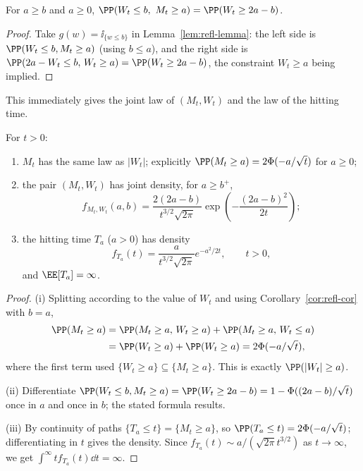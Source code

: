 \begin{corollary}\label{cor:refl-cor}
	For $a\geq b$ and $a\geq0$, $\PP(W_t\leq b,\ M_t\geq a) = \PP(W_t \geq 2a-b)$.
\end{corollary}

\begin{proof}
	Take $g(w) = \ii_{\{w\leq b\}}$ in Lemma~\ref{lem:refl-lemma}: the left side is $\PP(W_t\leq b, M_t\geq a)$ (using $b \leq a$), and the right side is $\PP(2a-W_t \leq b,\, W_t \geq a) = \PP(W_t\geq 2a-b)$, the constraint $W_t\geq a$ being implied.
\end{proof}

This immediately gives the joint law of $(M_t, W_t)$ and the law of the hitting time.

\begin{theorem}\label{thm:max-law}
	For $t>0$:
	\begin{enumerate}[label=(\roman*)]
		\item $M_t$ has the same law as $|W_t|$; explicitly $\PP(M_t\geq a) = 2\Phi(-a/\sqrt t)$ for $a\geq0$;
		\item the pair $(M_t,W_t)$ has joint density, for $a\geq b^+$,
		$$
		f_{M_t,W_t}(a,b) = \frac{2(2a-b)}{t^{3/2}\sqrt{2\pi}}\exp\left(-\frac{(2a-b)^2}{2t}\right);
		$$
		\item the hitting time $T_a$ ($a>0$) has density
		$$
		f_{T_a}(t) = \frac{a}{t^{3/2}\sqrt{2\pi}}e^{-a^2/2t}, \qquad t>0,
		$$
		and $\EE[T_a] = \infty$.
	\end{enumerate}
\end{theorem}

\begin{proof}
	(i) Splitting according to the value of $W_t$ and using Corollary~\ref{cor:refl-cor} with $b=a$,
	\begin{align*}
		\PP(M_t\geq a) &= \PP(M_t\geq a,\, W_t\geq a) + \PP(M_t \geq a,\, W_t\leq a)\\
		&= \PP(W_t\geq a) + \PP(W_t\geq a) = 2\Phi(-a/\sqrt t),
	\end{align*}
	where the first term used $\{W_t\geq a\}\subseteq\{M_t\geq a\}$. This is exactly $\PP(|W_t| \geq a)$.

	(ii) Differentiate $\PP(W_t\leq b, M_t\geq a) = \PP(W_t\geq 2a-b) = 1 - \Phi((2a-b)/\sqrt t)$ once in $a$ and once in $b$; the stated formula results.

	(iii) By continuity of paths $\{T_a\leq t\} = \{M_t\geq a\}$, so $\PP(T_a\leq t) = 2\Phi(-a/\sqrt t)$; differentiating in $t$ gives the density. Since $f_{T_a}(t)\sim a/(\sqrt{2\pi}t^{3/2})$ as $t\to\infty$, we get $\int^\infty t f_{T_a}(t)\dd t = \infty$.
\end{proof}


